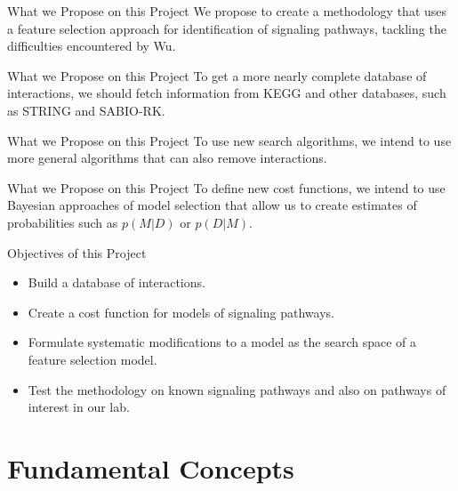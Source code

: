 \documentclass{beamer}
\begin{document}
\begin{frame}{What we Propose on this Project}
We propose to create a methodology that uses a feature selection 
approach for identification of signaling pathways, tackling the 
difficulties encountered by Wu.
\end{frame}


\begin{frame}{What we Propose on this Project}
To get a more nearly complete database of interactions, we should fetch 
information from KEGG and other databases, \pause such as STRING and
SABIO-RK.
\end{frame}


\begin{frame}{What we Propose on this Project}
To use new search algorithms, \pause we intend to use more general
algorithms that can also remove interactions.
\end{frame}


\begin{frame}{What we Propose on this Project}
To define new cost functions, \pause we intend to use Bayesian 
approaches of model selection that allow us to create estimates of 
probabilities such as $p (M | D)$ or $p (D | M)$.
\end{frame}


\begin{frame}{Objectives of this Project}
\begin{itemize}
\pause
\item{Build a database of interactions.}
\pause
\item{Create a cost function for models of signaling pathways.}
\pause
\item{Formulate systematic modifications to a model as the search space
    of a feature selection model.}
\pause
\item{Test the methodology on known signaling pathways and also on 
    pathways of interest in our lab.}
\end{itemize}
\end{frame}


\section{Fundamental Concepts}
\end{document}
